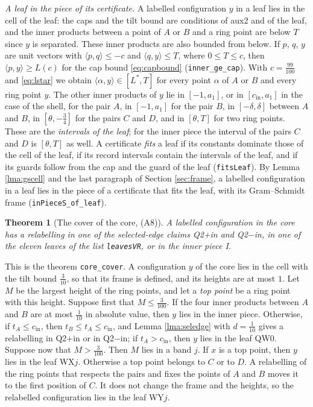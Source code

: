 \documentclass[reqno,a4paper,11pt]{amsart}
\numberwithin{equation}{section}
\newtheorem{theorem}{Theorem}[section]
\newcommand{\lean}[1]{\texttt{#1}}
\begin{document}
\emph{A leaf in the piece of its certificate.} A labelled configuration $y$ in a leaf lies in the cell of the leaf: the caps and the tilt bound are conditions of aux2 and of the leaf, and the inner products between a point of $A$ or $B$ and a ring point are below $T$ since $y$ is separated. These inner products are also bounded from below. If $p$, $q$, $y$ are unit vectors with $\langle p, q \rangle \leq -c$ and $\langle q, y \rangle \leq T$, where $0 \leq T \leq c$, then $\langle p, y \rangle \geq L(c)$ for the cap bound \eqref{eq:capbound} (\lean{inner\_ge\_cap}). With $c = \tfrac{99}{100}$ and \eqref{eq:lstar} we obtain $\langle \alpha, y \rangle \in [L^*, T]$ for every point $\alpha$ of $A$ or $B$ and every ring point $y$. The other inner products of $y$ lie in $[-1, a_1]$, or in $[c_{\mathrm{in}}, a_1]$ in the case of the shell, for the pair $A$, in $[-1, a_1]$ for the pair $B$, in $[-\delta, \delta]$ between $A$ and $B$, in $[\theta, -\tfrac34]$ for the pairs $C$ and $D$, and in $[\theta, T]$ for two ring points. These are the \emph{intervals of the leaf}; for the inner piece the interval of the pairs $C$ and $D$ is $[\theta, T]$ as well. A certificate \emph{fits} a leaf if its constants dominate those of the cell of the leaf, if its record intervals contain the intervals of the leaf, and if its guards follow from the cap and the guard of the leaf (\lean{fitsLeaf}). By Lemma \ref{lma:gscell} and the last paragraph of Section \ref{sec:frame}, a labelled configuration in a leaf lies in the piece of a certificate that fits the leaf, with its Gram--Schmidt frame (\lean{inPieceS\_of\_leaf}).

\begin{theorem}[The cover of the core, (A8)]\label{thm:core}
A labelled configuration in the core has a relabelling in one of the selected-edge claims \textup{Q2+in} and \textup{Q2$-$in}, in one of the eleven leaves of the list \lean{leavesVR}, or in the inner piece \textup{I}.
\end{theorem}

This is the theorem \lean{core\_cover}. A configuration $y$ of the core lies in the cell with the tilt bound $\tfrac{3}{10}$, so that its frame is defined, and its heights are at most $1$. Let $M$ be the largest height of the ring points, and let a \emph{top point} be a ring point with this height. Suppose first that $M \leq \tfrac{3}{100}$. If the four inner products between $A$ and $B$ are at most $\tfrac{1}{10}$ in absolute value, then $y$ lies in the inner piece. Otherwise, if $t_A \leq c_{\mathrm{in}}$, then $t_B \leq t_A \leq c_{\mathrm{in}}$, and Lemma \ref{lma:seledge} with $d = \tfrac{1}{10}$ gives a relabelling in Q2+in or in Q2$-$in; if $t_A > c_{\mathrm{in}}$, then $y$ lies in the leaf QW0. Suppose now that $M > \tfrac{3}{100}$. Then $M$ lies in a band $j$. If $x$ is a top point, then $y$ lies in the leaf WX$j$. Otherwise a top point belongs to $C$ or to $D$. A relabelling of the ring points that respects the pairs and fixes the points of $A$ and $B$ moves it to the first position of $C$. It does not change the frame and the heights, so the relabelled configuration lies in the leaf WY$j$.
\end{document}
